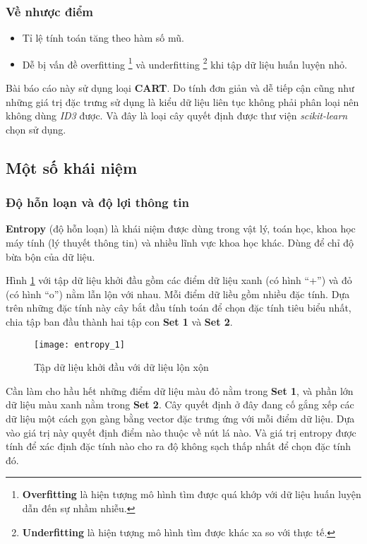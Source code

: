 \documentclass[../main-report.tex]{subfiles}
\begin{document}
\subsubsection*{Về nhược điểm}
\begin{itemize}
\item Tỉ lệ tính toán tăng theo hàm số mũ.
\item Dễ bị vấn đề overfitting \footnote{\textbf{Overfitting} là hiện tượng mô hình tìm được quá khớp với dữ liệu huấn luyện dẫn đến sự nhầm nhiễu.} và underfitting \footnote{\textbf{Underfitting} là hiện tượng mô hình tìm được khác xa so với thực tế.} khi tập dữ liệu huấn luyện nhỏ.
\end{itemize}

Bài báo cáo này sử dụng loại \textbf{CART}. Do tính đơn giản và dễ tiếp cận cũng như những giá trị đặc trưng sử dụng là kiểu dữ liệu liên tục không phải phân loại nên không dùng \emph{ID3} được. Và đây là loại cây quyết định được thư viện \textit{scikit-learn} chọn sử dụng.

\subsection{Một số khái niệm}
\subsubsection{Độ hỗn loạn và độ lợi thông tin}
\textbf{Entropy} (độ hỗn loạn) là khái niệm được dùng trong vật lý, toán học, khoa học máy tính (lý thuyết thông tin) và nhiều lĩnh vực khoa học khác. Dùng để chỉ độ bừa bộn của dữ liệu.

Hình \ref{fig:entropy_1} với tập dữ liệu khởi đầu gồm các điểm dữ liệu xanh (có hình ``+'') và đỏ (có hình ``o'') nằm lẫn lộn với nhau. Mỗi điểm dữ liều gồm nhiều đặc tính. Dựa trên những đặc tính này cây bắt đầu tính toán để chọn đặc tính tiêu biểu nhất, chia tập ban đầu thành hai tập con \textbf{Set 1} và \textbf{Set 2}.

\begin{figure}[ht!]
\centering\texttt{[image: entropy\_1]}
\caption{Tập dữ liệu khởi đầu với dữ liệu lộn xộn}
\label{fig:entropy_1}
\end{figure}

Cần làm cho hầu hết những điểm dữ liệu màu đỏ nằm trong \textbf{Set 1}, và phần lớn dữ liệu màu xanh nằm trong \textbf{Set 2}. Cây quyết định ở đây đang cố gắng xếp các dữ liệu một cách gọn gàng bằng vector đặc trưng ứng với mỗi điểm dữ liệu. Dựa vào giá trị này quyết định điểm nào thuộc về nút lá nào. Và giá trị entropy được tính để xác định đặc tính nào cho ra độ không sạch thấp nhất để chọn đặc tính đó.
\end{document}
